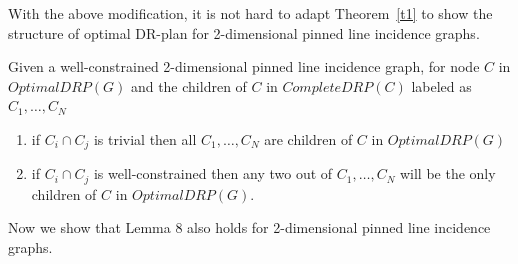 With the above modification, 
it is not hard to adapt Theorem~\ref{t1} %
to show the structure of optimal DR-plan for 2-dimensional pinned line incidence graphs.


\begin{corollary}
Given a well-constrained 2-dimensional pinned line incidence graph, for node $C$ in $OptimalDRP(G)$ and the children of $C$ in $CompleteDRP(C)$ labeled as $C_1,\ldots,C_N$
\begin{enumerate}
    \item if $C_i \cap C_j$ is trivial then all $C_1,\ldots,C_N$ are children of $C$ in $OptimalDRP(G)$
    \item if $C_i \cap C_j$ is well-constrained then any two out of $C_1,\ldots,C_N$ will be the only children of $C$ in $OptimalDRP(G)$.
\end{enumerate}
\label{cor:pinned}
\end{corollary}





Now we  show that Lemma 8 also holds for 2-dimensional pinned line incidence graphs. 

